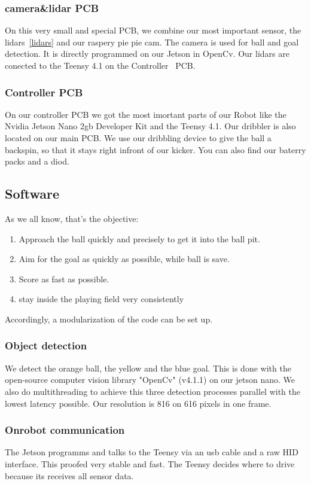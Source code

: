 \documentclass{scrartcl}
\begin{document}
\subsubsection*{camera\&lidar PCB}
On this very small and special PCB, we combine our most important sensor, the lidars~\ref{lidars} and our raspery pie 
pie cam. The camera is used for ball and goal detection. It is directly programmed on our Jetson in OpenCv.
Our lidars are conected to the Teensy 4.1 on the Controller~\label{PCB:Controller} PCB.

\subsubsection{Controller PCB}

On our controller PCB we got the most imortant parts of our Robot like the Nvidia Jetson Nano 2gb Developer Kit
and the Teensy 4.1. Our dribbler is also located on our main PCB. We use our dribbling device
to give the ball a backspin, so that it stays right infront of our kicker. You can also find our baterry packs 
and a diod. 

 \subsection{Software} %
 As we all know, that's the objective:
 \begin{enumerate}
     \item{Approach the ball quickly and precisely to get it into the ball pit.}
     \item{Aim for the goal as quickly as possible, while ball is save.}
     \item{Score as fast as possible.}
     \item {stay inside the playing field very consistently}
 \end{enumerate}
 Accordingly, a modularization of the code can be set up.
 \subsubsection{Object detection}
We detect the orange ball, the yellow and the blue goal. This is done with the open-source computer vision library "OpenCv" (v4.1.1) 
on our jetson nano. We also do multithreading to achieve this three detection processes parallel with the lowest latency possible.
Our resolution is 816 on 616 pixels in one frame.
\subsubsection{Onrobot communication}
The Jetson programms and talks to the Teensy via an usb cable and a raw HID interface. This proofed very stable and fast. The Teensy decides where 
to drive because its receives all sensor data.   
 
\end{document}
